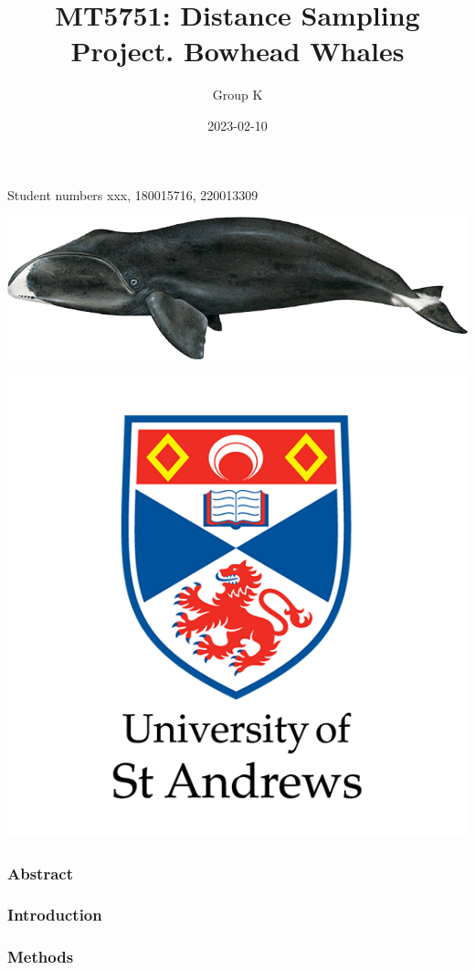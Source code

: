 \documentclass[
  12pt,
]{article}
\title{MT5751: Distance Sampling Project. Bowhead Whales}
\author{Group K}
\date{2023-02-10}
\begin{document}
\maketitle

\begin{center}

Student numbers xxx, 180015716, 220013309

\end{center}

\hfill\break

\begin{center}\includegraphics[width=0.50\linewidth]{Subject} \end{center}

\begin{center}\includegraphics[width=0.50\linewidth]{logo} \end{center}

\newpage

\hypertarget{abstract}{%
\subsubsection{Abstract}\label{abstract}}

\hypertarget{introduction}{%
\subsubsection{Introduction}\label{introduction}}

\hypertarget{methods}{%
\subsubsection{Methods}\label{methods}}
\end{document}
